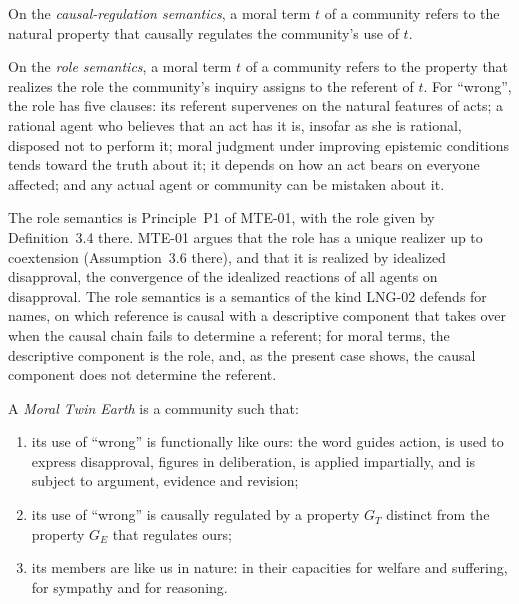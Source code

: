 \documentclass{situationist-preprint}
\begin{document}
\begin{definition}\label{d:crs}
On the \emph{causal-regulation semantics}, a moral term $t$ of a community refers to the natural property that causally regulates the community's use of $t$.
\end{definition}

\begin{definition}\label{d:rs}
On the \emph{role semantics}, a moral term $t$ of a community refers to the property that realizes the role the community's inquiry assigns to the referent of $t$. For \enquote{wrong}, the role has five clauses: its referent supervenes on the natural features of acts; a rational agent who believes that an act has it is, insofar as she is rational, disposed not to perform it; moral judgment under improving epistemic conditions tends toward the truth about it; it depends on how an act bears on everyone affected; and any actual agent or community can be mistaken about it.
\end{definition}

The role semantics is Principle~P1 of MTE-01, with the role given by Definition~3.4 there. MTE-01 argues that the role has a unique realizer up to coextension (Assumption~3.6 there), and that it is realized by idealized disapproval, the convergence of the idealized reactions of all agents on disapproval. The role semantics is a semantics of the kind LNG-02 defends for names, on which reference is causal with a descriptive component that takes over when the causal chain fails to determine a referent; for moral terms, the descriptive component is the role, and, as the present case shows, the causal component does not determine the referent.

\begin{definition}\label{d:mte}
A \emph{Moral Twin Earth} is a community such that:
\begin{enumerate}[label=(\alph*)]
\item its use of \enquote{wrong} is functionally like ours: the word guides action, is used to express disapproval, figures in deliberation, is applied impartially, and is subject to argument, evidence and revision;
\item its use of \enquote{wrong} is causally regulated by a property $G_T$ distinct from the property $G_E$ that regulates ours;
\item its members are like us in nature: in their capacities for welfare and suffering, for sympathy and for reasoning.
\end{enumerate}
\end{definition}
\end{document}
